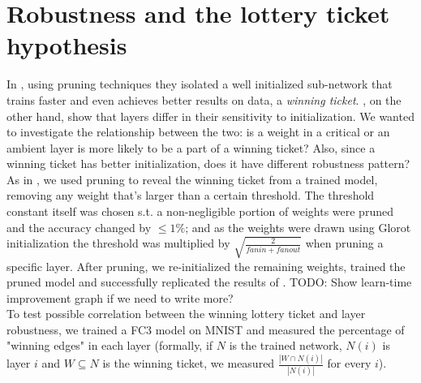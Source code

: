 \documentclass{article}
\begin{document}
\section{Robustness and the lottery ticket hypothesis} \label{winnerySection}
    
In \cite{frankle2018lottery}, using pruning techniques they isolated a well initialized sub-network that trains faster and even achieves better results on data, a \emph{winning ticket}. \cite{allLayers}, on the other hand, show that layers differ in their sensitivity to initialization. We wanted to investigate the relationship between the two: is a weight in a critical or an ambient layer is more likely to be a part of a winning ticket? Also, since a winning ticket has better initialization, does it have different robustness pattern? \\
As in \cite{frankle2018lottery}, we used pruning to reveal the winning ticket from a trained model, removing any weight that's larger than a certain threshold. The threshold constant itself was chosen s.t. a non-negligible portion of weights were pruned and the accuracy changed by $\leq 1\%$; and as the weights were drawn using Glorot initialization the threshold was multiplied by $\sqrt{\frac{2}{fanin + fanout}}$ when pruning a specific layer. After pruning, we re-initialized the remaining weights, trained the pruned model and successfully replicated the results of \cite{frankle2018lottery}. TODO: Show learn-time improvement graph if we need to write more?\\
To test possible correlation between the winning lottery ticket and layer robustness, we trained a FC3 model on MNIST and measured the percentage of "winning edges" in each layer (formally, if $N$ is the trained network, $N(i)$ is layer $i$ and $W\subseteq N$ is the winning ticket, we measured $\frac{|W\cap N(i)|}{|N(i)|}$ for every $i$).\\
\end{document}
